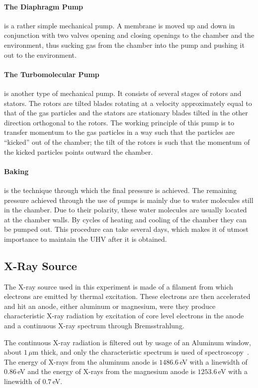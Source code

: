 \documentclass[a4paper,10pt]{scrartcl}
\begin{document}
\paragraph{The Diaphragm Pump} is a rather simple mechanical pump. A membrane is moved up and down in conjunction with two valves opening and closing openings to the chamber and the environment, thus sucking gas from the chamber into the pump and pushing it out to the environment.

\paragraph{The Turbomolecular Pump} is another type of mechanical pump. It consists of several stages of rotors and stators. The rotors are tilted blades rotating at a velocity approximately equal to that of the gas particles and the stators are stationary blades tilted in the other direction orthogonal to the rotors. The working principle of this pump is to transfer momentum to the gas particles in a way such that the particles are ``kicked'' out of the chamber; the tilt of the rotors is such that the momentum of the kicked particles points outward the chamber.

\paragraph{Baking} is the technique through which the final pressure is achieved. The remaining pressure achieved through the use of pumps is mainly due to water molecules still in the chamber. Due to their polarity, these water molecules are usually located at the chamber walls. By cycles of heating and cooling of the chamber they can be pumped out. This procedure can take several days, which makes it of utmost importance to maintain the UHV after it is obtained.

\subsection{X-Ray Source}

The X-ray source used in this experiment is made of a filament from which electrons are emitted by thermal excitation. These electrons are then accelerated and hit an anode, either aluminum or magnesium, were they produce characteristic X-ray radiation by excitation of core level electrons in the anode and a continuous X-ray spectrum through Bremsstrahlung.

The continuous X-ray radiation is filtered out by usage of an Aluminum window, about $1\,\mu$m thick, and only the characteristic spectrum is used of spectroscopy~\cite{skript}. The energy of X-rays from the aluminum anode is $1486.6\,$eV with a linewidth of $0.86\,$eV and the energy of X-rays from the magnesium anode is $1253.6\,$eV with a linewidth of $0.7\,$eV.
\end{document}
